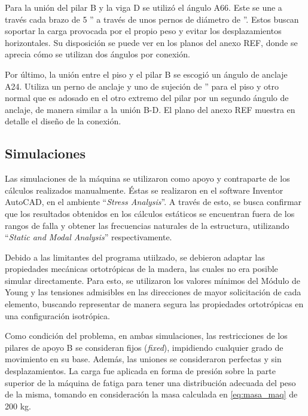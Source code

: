 Para la unión del pilar B y la viga D se utilizó el ángulo A66. Este se une a través cada brazo de 5 '' a través de unos pernos de diámetro de ''. Estos buscan soportar la carga provocada por el propio peso y evitar los desplazamientos horizontales. Su disposición se puede ver en los planos del anexo REF, donde se aprecia cómo se utilizan dos ángulos por conexión.

Por último, la unión entre el piso y el pilar B se escogió un ángulo de anclaje A24. Utiliza un perno de anclaje y uno de sujeción de '' para el piso y otro normal que es adosado en el otro extremo del pilar por un segundo ángulo de anclaje, de manera similar a la unión B-D. El plano del anexo REF muestra en detalle el diseño de la conexión.
 
\subsection{Simulaciones}
Las simulaciones de la máquina se utilizaron como apoyo y contraparte de los cálculos realizados manualmente. Éstas se realizaron en el software Inventor AutoCAD, en el ambiente ``\textit{Stress Analysis}''. A través de esto, se busca confirmar que los resultados obtenidos en los cálculos estáticos se encuentran fuera de los rangos de falla y obtener las frecuencias naturales de la estructura, utilizando ``\textit{Static and Modal Analysis}'' respectivamente.

Debido a las limitantes del programa utiilzado, se debieron adaptar las propiedades mecánicas ortotrópicas de la madera, las cuales no era posible simular directamente. Para esto, se utilizaron los valores mínimos del Módulo de Young y las tensiones admisibles en las direcciones de mayor solicitación de cada elemento, buscando representar de manera segura las propiedades ortotrópicas en una configuración isotrópica.

Como condición del problema, en ambas simulaciones, las restricciones de los pilares de apoyo B se consideran fijos (\textit{fixed}), impidiendo cualquier grado de movimiento en su base. Además, las uniones se consideraron perfectas y sin desplazamientos. La carga fue aplicada en forma de presión sobre la parte superior de la máquina de fatiga para tener una distribución adecuada del peso de la misma, tomando en consideración la masa calculada en \ref{eq:masa_maq} de 200 kg.

